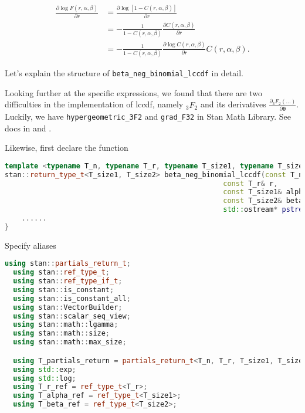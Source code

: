 \documentclass[11pt]{article}
\begin{document}
\begin{equation}
\begin{aligned}
	\frac{\partial \log F(r,\alpha,\beta)}{\partial r} &= \frac{\partial \log [1 - C(r,\alpha,\beta)]}{\partial r}\\
	 &= - \frac{1}{1 - C(r,\alpha,\beta)} \frac{\partial C(r,\alpha,\beta)}{\partial r} \\
	 &= - \frac{1}{1 - C(r,\alpha,\beta)} \frac{\partial \log C(r,\alpha,\beta)}{\partial r} C(r,\alpha,\beta).
\end{aligned}
\end{equation}

Let’s explain the structure of \verb|beta_neg_binomial_lccdf| in detail.

Looking further at the specific expressions, we found that there are two difficulties in the implementation of lccdf, namely ${}_3F_2$ and its derivatives $\frac{\partial {}_3F_2(...)}{\partial \boldsymbol{\theta}}$. Luckily, we have \verb|hypergeometric_3F2| and \verb|grad_F32| in Stan Math Library. See docs in  and .





Likewise, first declare the function
\begin{lstlisting}[language=c++, style=lgeneral]
template <typename T_n, typename T_r, typename T_size1, typename T_size2>
stan::return_type_t<T_size1, T_size2> beta_neg_binomial_lccdf(const T_n& n,
                                                    const T_r& r,
                                                    const T_size1& alpha,
                                                    const T_size2& beta,
                                                    std::ostream* pstream__) {
	......
}
\end{lstlisting}

Specify aliases
\begin{lstlisting}[language=c++, style=lgeneral]
  using stan::partials_return_t;
  using stan::ref_type_t;
  using stan::ref_type_if_t;
  using stan::is_constant;
  using stan::is_constant_all;
  using stan::VectorBuilder;
  using stan::scalar_seq_view;
  using stan::math::lgamma;
  using stan::math::size;
  using stan::math::max_size;

  using T_partials_return = partials_return_t<T_n, T_r, T_size1, T_size2>;
  using std::exp;
  using std::log;
  using T_r_ref = ref_type_t<T_r>;
  using T_alpha_ref = ref_type_t<T_size1>;
  using T_beta_ref = ref_type_t<T_size2>;
\end{lstlisting}
\end{document}

